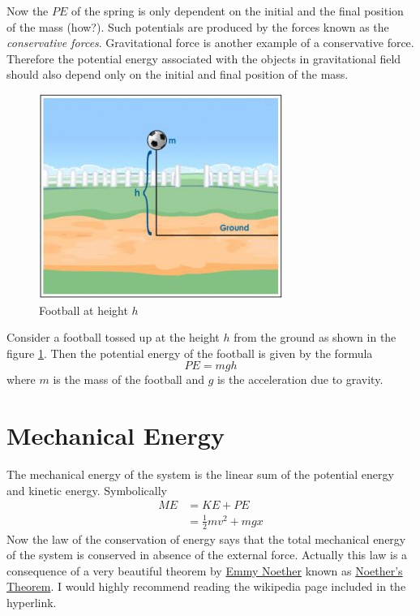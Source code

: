 \documentclass[10pt]{article}
\begin{document}
Now the $PE$ of the spring is only dependent on the initial and the final position of the mass (how?).  Such potentials are produced by the forces known as the \emph{conservative forces}.  Gravitational force is another example of a conservative force.  Therefore the potential energy associated with the objects in gravitational field should also depend only on the initial and final position of the mass.  

\begin{figure}[h]
\includegraphics[scale=.5]{potenergyfootball}
\centering
\caption{Football at height $h$}
\label{potfootball}
\centering
\end{figure}
Consider a football tossed up at the height $h$ from the ground as shown in the figure \ref{potfootball}.  Then the potential energy of the football is given by the formula
\begin{equation}
  PE = mgh
\end{equation}
where $m$ is the mass of the football and $g$ is the acceleration due to gravity.
\section{Mechanical Energy}
The mechanical energy of the system is the linear sum of the potential energy and kinetic energy.  Symbolically
\begin{equation}
\begin{split}
  ME &= KE + PE\\
&= \frac{1}{2}mv^2 + mgx
\end{split}
\end{equation}
Now the law of the conservation of energy says that the total mechanical energy of the system is conserved in absence of the external force.  Actually this law is a consequence of a very beautiful theorem by \href{https://en.wikipedia.org/wiki/Emmy_Noether}{Emmy Noether} known as \href{https://en.wikipedia.org/wiki/Noether%27s_theorem}{Noether's Theorem}.  I would highly recommend reading the wikipedia page included in the hyperlink. 
\end{document}
